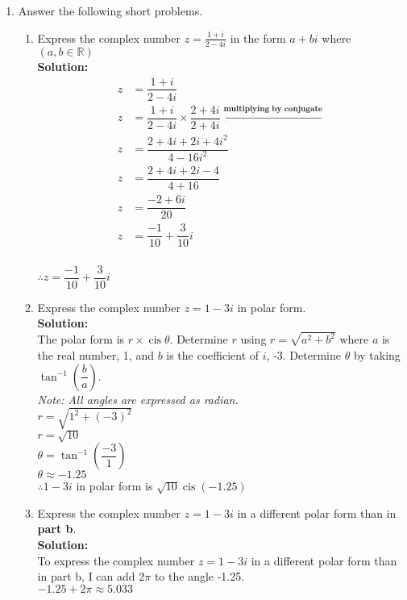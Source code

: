 \documentclass[12pt]{book}
\DeclareMathOperator\cis{cis} %
\begin{document}
\begin{enumerate}

\item Answer the following short problems.

\begin{enumerate}
\item Express the complex number $z=\frac{1+i}{2-4i}$ in the form $a+bi$ where $(a,b \in \mathbb{R})$\\

\textbf{Solution:}
\begingroup
\addtolength{\jot}{0.5em}
\begin{align}
    z &= \dfrac{1+i}{2-4i}\\
    z &= \dfrac{1+i}{2-4i} \times \dfrac{2+4i}{2+4i} \xleftarrow[]{\textbf{multiplying by conjugate}}\\
    z &= \dfrac{2+4i+2i+4i^2}{4-16i^2}\\
    z &= \dfrac{2+4i+2i-4}{4+16}\\
    z &= \dfrac{-2+6i}{20}\\
    z &= \dfrac{-1}{10} + \dfrac{3}{10}i
\end{align}\\
$\therefore z = \dfrac{-1}{10} + \dfrac{3}{10}i$
\endgroup
\item Express the complex number $z=1-3i$ in polar form. \\

\textbf{Solution:}\\
The polar form is $r\times \cis{\theta}$. Determine $r$ using $r = \sqrt{a^2 + b^2}$ where $a$ is the real number, 1, and $b$ is the coefficient of $i$, -3. Determine $\theta$ by taking $\tan^{-1} \left(\dfrac{b}{a}\right)$.\\
\textit{Note: All angles are expressed as radian.}\\

$r = \sqrt{1^2 + (-3)^2}$ \\
$r = \sqrt{10}$ \\
$\theta = \tan^{-1} \left(\dfrac{-3}{1}\right)$\\
$\theta \approx -1.25$\\

$\therefore 1 - 3i $ in polar form is $\sqrt{10} \cis(-1.25)$
\item Express the complex number $z=1-3i$ in a different polar form than in \textbf{part b}.\\

\textbf{Solution:}\\
To express the complex number $z=1-3i$ in a different polar form than in part b, I can add $2\pi$ to the angle -1.25.\\
$-1.25 + 2\pi \approx 5.033$\\


\end{enumerate}
\end{enumerate}
\end{document}
